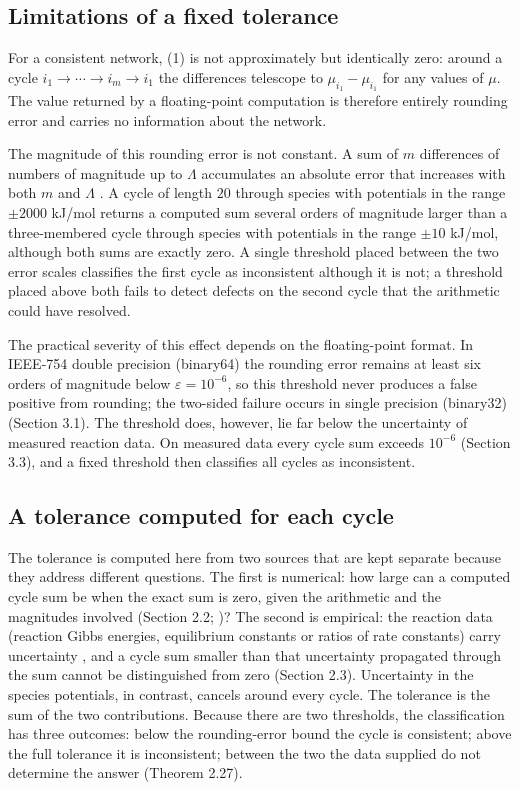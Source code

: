 \documentclass[11pt,a4paper]{article}
\theoremstyle{pstyle}
\theoremstyle{definition}
\theoremstyle{remark}
\newcommand{\eps}{\varepsilon}
\begin{document}
\subsection{Limitations of a fixed tolerance}

For a consistent network, (1) is not
approximately but identically zero: around a cycle
$i_1\to\cdots\to i_m\to i_1$ the differences telescope to
$\mu_{i_1}-\mu_{i_1}$ for any values of $\mu$. The value returned by a
floating-point computation is therefore entirely rounding error and
carries no information about the network.

The magnitude of this rounding error is not constant. A sum of $m$
differences of numbers of magnitude up to $\Lambda$ accumulates an
absolute error that increases with both $m$ and $\Lambda$
\citep{higham2002,goldberg1991}. A cycle of length $20$ through species
with potentials in the range $\pm 2000$ kJ/mol returns a computed sum
several orders of magnitude larger than a three-membered cycle through
species with potentials in the range $\pm 10$ kJ/mol, although both sums
are exactly zero. A single threshold placed between the two error
scales classifies the first cycle as inconsistent although it is not; a
threshold placed above both fails to detect defects on the second cycle
that the arithmetic could have resolved.

The practical severity of this effect depends on the floating-point
format. In IEEE-754 double precision (binary64) the rounding error
remains at least six orders of magnitude below $\eps=10^{-6}$, so this
threshold never produces a false positive from rounding; the two-sided
failure occurs in single precision (binary32)
(Section 3.1). The threshold does, however, lie far
below the uncertainty of measured reaction data. On measured data every
cycle sum exceeds $10^{-6}$ (Section 3.3), and a fixed threshold
then classifies all cycles as inconsistent.

\subsection{A tolerance computed for each cycle}

The tolerance is computed here from two sources that are kept separate
because they address different questions. The first is numerical: how
large can a computed cycle sum be when the exact sum is zero, given the
arithmetic and the magnitudes involved
(Section 2.2; \citealp{higham2002})? The second is
empirical: the reaction data (reaction Gibbs energies, equilibrium
constants or ratios of rate constants) carry uncertainty
\citep{alberty1998,noor2013,flamholz2012}, and a cycle sum smaller than
that uncertainty propagated through the sum cannot be distinguished from
zero (Section 2.3). Uncertainty in the species potentials, in
contrast, cancels around every cycle. The tolerance is the sum of the
two contributions. Because there are two thresholds, the classification
has three outcomes: below the rounding-error bound the cycle is
consistent; above the full tolerance it is inconsistent; between the two
the data supplied do not determine the answer (Theorem 2.27).
\end{document}
